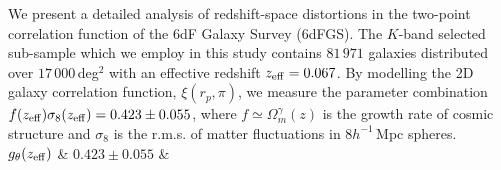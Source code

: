 We present a detailed analysis of redshift-space distortions in the two-point correlation function of the 6dF Galaxy Survey (6dFGS). The $K$-band selected sub-sample which we employ in this study contains $81\,971$ galaxies distributed over $17\,000\,$deg$^2$ with an effective redshift $z_{\rm eff} = 0.067$. By modelling the 2D galaxy correlation function, $\xi(r_p,\pi)$, we measure the parameter combination $f(z_{\rm eff})\sigma_8(z_{\rm eff}) = 0.423 \pm 0.055$, where $f \simeq \Omega_m^{\gamma}(z)$ is the growth rate of cosmic structure and $\sigma_8$ is the r.m.s. of matter fluctuations in $8h^{-1}\,$Mpc spheres.\\
$g_{\theta}(z_{\rm eff})$ & $0.423\pm0.055$ & \\

